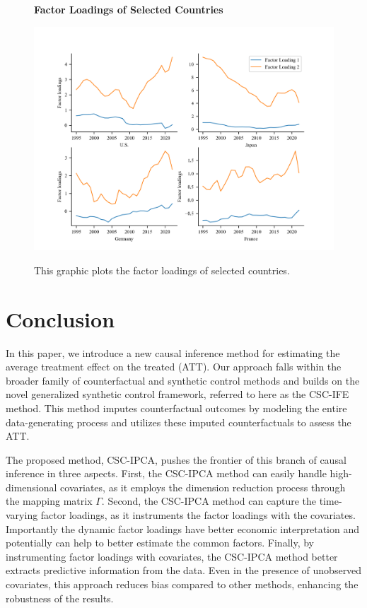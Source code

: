 \documentclass[12pt]{article}
\begin{document}
\begin{figure}[!ht]
    \centering
    \caption{\textbf{Factor Loadings of Selected Countries}} 
    \includegraphics{figs/loadings_ipca.png}
    \label{fig: loadings}
    \caption*{\footnotesize{This graphic plots the factor loadings of selected countries.}}
\end{figure}
\section{Conclusion} 
\label{sec: conclusion}
In this paper, we introduce a new causal inference method for estimating the average treatment effect on the treated (ATT). Our approach falls within the broader family of counterfactual and synthetic control methods and builds on the novel generalized synthetic control framework, referred to here as the CSC-IFE method. This method imputes counterfactual outcomes by modeling the entire data-generating process and utilizes these imputed counterfactuals to assess the ATT.

The proposed method, CSC-IPCA, pushes the frontier of this branch of causal inference in three aspects. First, the CSC-IPCA method can easily handle high-dimensional covariates, as it employs the dimension reduction process through the mapping matrix $\Gamma$. Second, the CSC-IPCA method can capture the time-varying factor loadings, as it instruments the factor loadings with the covariates. Importantly the dynamic factor loadings have better economic interpretation and potentially can help to better estimate the common factors. Finally, by instrumenting factor loadings with covariates, the CSC-IPCA method better extracts predictive information from the data. Even in the presence of unobserved covariates, this approach reduces bias compared to other methods, enhancing the robustness of the results.
\end{document}
